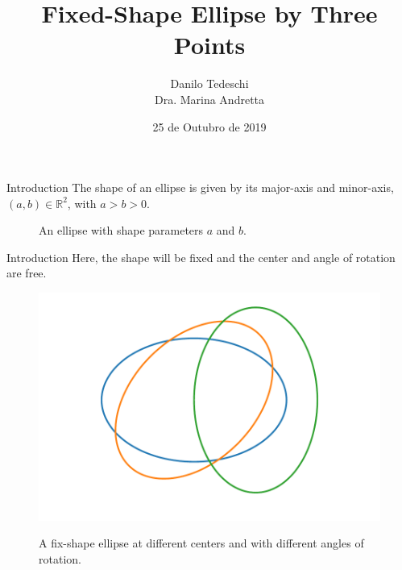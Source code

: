 \documentclass{beamer}
\author{Danilo Tedeschi\\Dra. Marina Andretta}
\title{Fixed-Shape Ellipse by Three Points}
\institute{Universidade de São Paulo}
\date{25 de Outubro de 2019}
\begin{document}
	
	\begin{frame}[t,plain]
		\titlepage
	\end{frame}
	
	\begin{frame}{Introduction}
		The shape of an ellipse is given by its major-axis and minor-axis, $(a, b) \in \mathbb{R}^2$, with $a > b > 0$.
		
		\begin{figure}[H]
			\centering
			
			
			\label{fig:ellipse_params}
			\caption{An ellipse with shape parameters $a$ and $b$.}
		\end{figure}
		
	\end{frame}

\begin{frame}{Introduction}
	Here, the shape will be fixed and the center and angle of rotation are free.
	
	\begin{figure}
	\centering
	
	\includegraphics[scale=.5]{3ellipses.pdf}
	\label{fig:ell}
	\caption{A fix-shape ellipse at different centers and with different angles of rotation.}
	\end{figure}
\end{frame}
\end{document}
